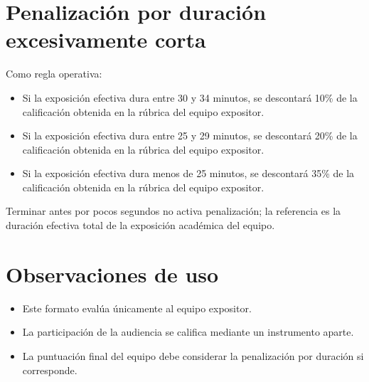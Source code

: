 \documentclass[11pt]{article}
\begin{document}
\section{Penalización por duración excesivamente corta}
\begin{warnbox}
Como regla operativa:
\begin{itemize}
\item Si la exposición efectiva dura entre 30 y 34 minutos, se descontará 10\% de la calificación obtenida en la rúbrica del equipo expositor.
\item Si la exposición efectiva dura entre 25 y 29 minutos, se descontará 20\% de la calificación obtenida en la rúbrica del equipo expositor.
\item Si la exposición efectiva dura menos de 25 minutos, se descontará 35\% de la calificación obtenida en la rúbrica del equipo expositor.
\end{itemize}
Terminar antes por pocos segundos no activa penalización; la referencia es la duración efectiva total de la exposición académica del equipo.
\end{warnbox}

\section{Observaciones de uso}
\begin{itemize}
\item Este formato evalúa únicamente al equipo expositor.
\item La participación de la audiencia se califica mediante un instrumento aparte.
\item La puntuación final del equipo debe considerar la penalización por duración si corresponde.
\end{itemize}
\end{document}
